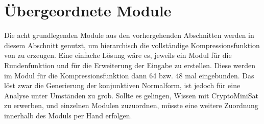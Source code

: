 \section{Übergeordnete Module}
\label{sec:knf:module}

Die acht grundlegenden Module aus den vorhergehenden Abschnitten werden in diesem Abschnitt genutzt,
um hierarchisch die vollständige Kompressionsfunktion von  zu erzeugen. Eine einfache Lösung wäre es,
jeweils ein Modul für die Rundenfunktion und für die Erweiterung der Eingabe zu erstellen. Diese werden
im Modul für die Kompressionsfunktion dann 64 bzw. 48 mal eingebunden. Das löst zwar die Generierung der konjunktiven
Normalform, ist jedoch für eine Analyse unter Umständen zu grob. Sollte es gelingen, Wissen mit CryptoMiniSat zu erwerben,
und einzelnen Modulen zuzuordnen, müsste eine weitere Zuordnung innerhalb des Moduls per Hand erfolgen.

